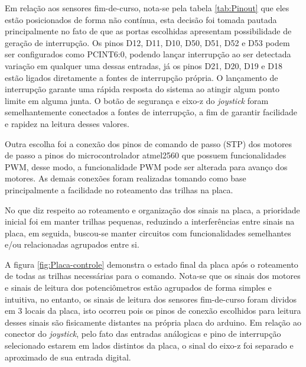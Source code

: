 Em relação aos sensores fim-de-curso, nota-se pela tabela \ref{tab:Pinout}
que eles estão posicionados de forma não contínua, esta decisão foi tomada
pautada principalmente no fato de que as portas escolhidas apresentam
possibilidade de geração de interrupção. Os pinos D12, D11, D10, D50, D51,
D52 e D53 podem ser configurados como PCINT6:0, podendo lançar interrupção
ao ser detectada variação em qualquer uma dessas entradas, já os pinos
D21, D20, D19 e D18 estão ligados diretamente a fontes de interrupção
própria. O lançamento de interrupção garante uma rápida resposta
do sistema ao atingir algum ponto limite em alguma junta. O botão de 
segurança e eixo-z do \textit{joystick} foram semelhantemente conectados
a fontes de interrupção, a fim de garantir facilidade e rapidez na leitura desses
valores.

Outra escolha foi a conexão dos pinos de comando de passo (STP) dos
motores de passo a pinos do microcontrolador atmel2560 que possuem
funcionalidades PWM, desse modo, a funcionalidade PWM pode ser alterada
para avanço dos motores. 
As demais conexões foram realizadas tomando como base principalmente 
a facilidade no roteamento das trilhas na placa.

No que diz respeito ao roteamento e organização dos sinais na placa, 
a prioridade inicial foi em manter trilhas pequenas, reduzindo a 
interferências entre sinais na placa, em seguida, buscou-se manter 
circuitos com funcionalidades semelhantes e/ou relacionadas agrupados
entre si.

A figura \ref{fig:Placa-controle} demonstra o estado final da placa 
após o roteamento de todas as trilhas necessárias para o comando.
Nota-se que os sinais dos motores e sinais de leitura dos potenciômetros
estão agrupados de forma simples e intuitiva, no entanto, os sinais de 
leitura dos sensores fim-de-curso foram dividos em 3 locais da placa, 
isto ocorreu pois os pinos de conexão escolhidos para leitura desses 
sinais são fisicamente distantes na própria placa do arduino. Em 
relação ao conector do \textit{joystick}, pelo fato das entradas análogicas e 
pino de interrupção selecionado estarem em lados distintos da placa, o
sinal do eixo-z foi separado e aproximado de sua entrada digital.

